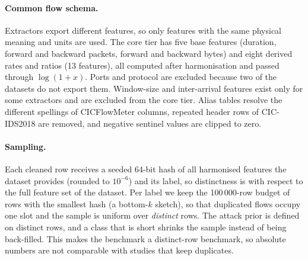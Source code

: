 \documentclass[11pt]{article}
\begin{document}
\begin{table}[t]
\centering\small
\caption{Datasets. The attack prior is that of the distinct rows after harmonisation. CTU-13 supports only the minimal feature tier and is excluded from the seven-dataset benchmark.}\label{tab:datasets}

\end{table}

\paragraph{Common flow schema.}
Extractors export different features, so only features with the same physical meaning and units are used.
The core tier has five base features (duration, forward and backward packets, forward and backward bytes) and eight derived rates and ratios (13 features), all computed after harmonisation and passed through $\log(1+x)$.
Ports and protocol are excluded because two of the datasets do not export them.
Window-size and inter-arrival features exist only for some extractors and are excluded from the core tier.
Alias tables resolve the different spellings of CICFlowMeter columns, repeated header rows of CIC-IDS2018 are removed, and negative sentinel values are clipped to zero.

\paragraph{Sampling.}
Each cleaned row receives a seeded 64-bit hash of all harmonised features the dataset provides (rounded to $10^{-6}$) and its label, so distinctness is with respect to the full feature set of the dataset.
Per label we keep the 100\,000-row budget of rows with the smallest hash (a bottom-$k$ sketch), so that duplicated flows occupy one slot and the sample is uniform over \emph{distinct} rows.
The attack prior is defined on distinct rows, and a class that is short shrinks the sample instead of being back-filled.
This makes the benchmark a distinct-row benchmark, so absolute numbers are not comparable with studies that keep duplicates.
\end{document}
